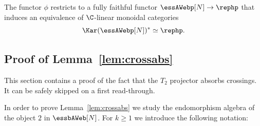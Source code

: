 \begin{rema} The functor $\phi$ restricts to a fully faithful functor $\essAWebp[N] \to \rephp$ that induces an equivalence of $\C$-linear monoidal categories \[\Kar(\essAWebp[N])^* \simeq \rephp.\]
\end{rema}

\subsection{Proof of Lemma~\ref{lem:crossabs}}
\label{sec:proofs}
This section contains a proof of the fact that the $T_2$ projector absorbs crossings. It can be safely skipped on a first read-through.

In order to prove Lemma~\ref{lem:crossabs} we study the endomorphism algebra of the object $2$ in $\essbAWeb[N]$. For $k\geq 1$ we introduce the following notation: 

